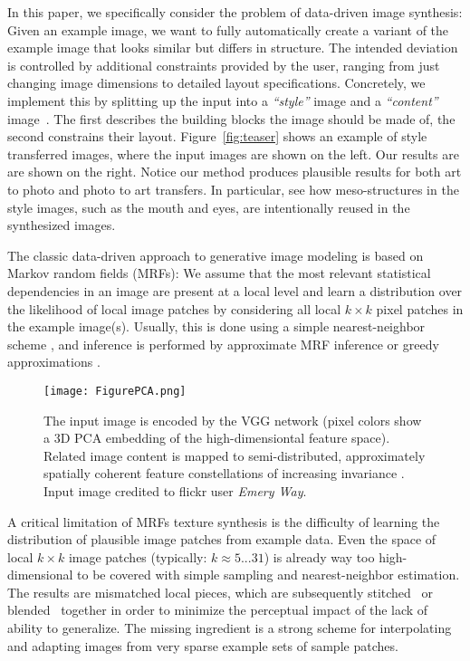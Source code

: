 \documentclass[10pt,twocolumn,letterpaper]{article}
\begin{document}
In this paper, we specifically consider the problem of data-driven image synthesis: Given an example image, we want to fully automatically create a variant of the example image that looks similar but differs in structure. The intended deviation is controlled by additional constraints provided by the user, ranging from just changing image dimensions to detailed layout specifications. Concretely, we implement this by splitting up the input into a \emph{``style''} image and a \emph{``content''} image~\cite{Gatys2015b,Hertzmann01}. The first describes the building blocks the image should be made of, the second constrains their layout. Figure~\ref{fig:teaser} shows an example of style transferred images, where the input images are shown on the left. Our results are are shown on the right. Notice our method produces plausible results for both art to photo and photo to art transfers. In particular, see how meso-structures in the style images, such as the mouth and eyes, are intentionally reused in the synthesized images.

The classic data-driven approach to generative image modeling is based on Markov random fields (MRFs): We assume that the most relevant statistical dependencies in an image are present at a local level and learn a distribution over the likelihood of local image patches by considering all local $k \times k$ pixel patches in the example image(s). Usually, this is done using a simple nearest-neighbor scheme \cite{Efros99}, and inference is performed by approximate MRF inference \cite{Efros01,Kwatra05,Kwatra03} or greedy approximations \cite{Barnes09,Efros99,Hertzmann01,Wei00}.

\begin{figure*}[t]
	\centering
		\texttt{[image: FigurePCA.png]}
		\caption{The input image is encoded by the VGG network (pixel colors show a 3D PCA embedding of the high-dimensiontal feature space). Related image content is mapped to semi-distributed, approximately spatially coherent feature constellations of increasing invariance \protect\cite{Zeiler14}. Input image credited to flickr user \emph{Emery Way}.}
	\label{fig:PCAface}
\end{figure*}

A critical limitation of MRFs texture synthesis is the difficulty of learning the distribution of plausible image patches from example data. Even the space of local $k \times k$ image patches (typically: $k \approx 5...31$) is already way too high-dimensional to be covered with simple sampling and nearest-neighbor estimation. The results are mismatched local pieces, which are subsequently stitched~\cite{Kwatra03} or blended~\cite{Kwatra05} together in order to minimize the perceptual impact of the lack of ability to generalize. The missing ingredient is a strong scheme for interpolating and adapting images from very sparse example sets of sample patches. 
\end{document}
